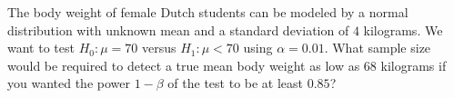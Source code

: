 The body weight of female Dutch students can be modeled by a normal distribution with unknown mean and a standard deviation of $4$ kilograms.
We want to test $H_0: \mu = 70$ versus $H_1: \mu < 70$ using $\alpha=0.01$.
What sample size would be required to detect a true mean body weight as low as $68$ kilograms if you wanted the power $1 - \beta$ of the test to be at least $0.85$?